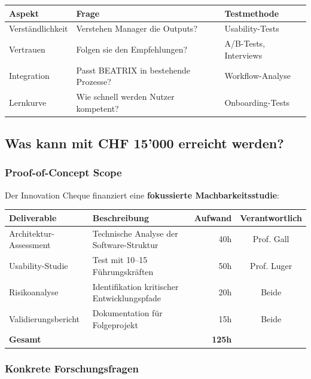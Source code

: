 \documentclass[11pt,a4paper]{article}
\begin{document}
\begin{table}[h]
\centering
\begin{tabularx}{\textwidth}{lXX}
\toprule
\textbf{Aspekt} & \textbf{Frage} & \textbf{Testmethode} \\
\midrule
Verständlichkeit & Verstehen Manager die Outputs? & Usability-Tests \\
Vertrauen & Folgen sie den Empfehlungen? & A/B-Tests, Interviews \\
Integration & Passt BEATRIX in bestehende Prozesse? & Workflow-Analyse \\
Lernkurve & Wie schnell werden Nutzer kompetent? & Onboarding-Tests \\
\bottomrule
\end{tabularx}
\end{table}

\subsection{Was kann mit CHF 15'000 erreicht werden?}

\subsubsection{Proof-of-Concept Scope}

Der Innovation Cheque finanziert eine \textbf{fokussierte Machbarkeitsstudie}:

\begin{table}[h]
\centering
\begin{tabular}{lXrc}
\toprule
\textbf{Deliverable} & \textbf{Beschreibung} & \textbf{Aufwand} & \textbf{Verantwortlich} \\
\midrule
Architektur-Assessment & Technische Analyse der Software-Struktur & 40h & Prof. Gall \\
Usability-Studie & Test mit 10--15 Führungskräften & 50h & Prof. Luger \\
Risikoanalyse & Identifikation kritischer Entwicklungspfade & 20h & Beide \\
Validierungsbericht & Dokumentation für Folgeprojekt & 15h & Beide \\
\midrule
\textbf{Gesamt} & & \textbf{125h} & \\
\bottomrule
\end{tabular}
\end{table}

\subsubsection{Konkrete Forschungsfragen}
\end{document}
